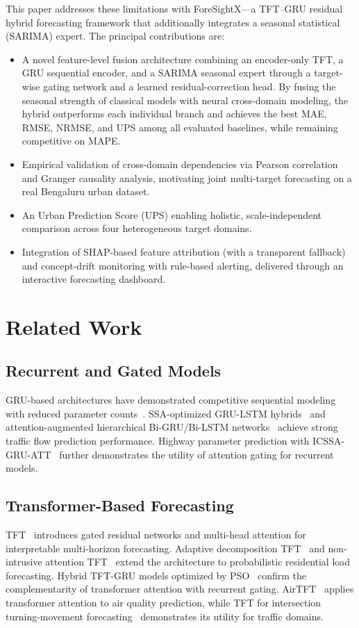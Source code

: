 \documentclass[conference]{IEEEtran}
\begin{document}
This paper addresses these limitations with ForeSightX---a TFT--GRU residual hybrid forecasting framework that additionally integrates a seasonal statistical (SARIMA) expert. The principal contributions are:
\begin{itemize}
\item A novel feature-level fusion architecture combining an encoder-only TFT, a GRU sequential encoder, and a SARIMA seasonal expert through a target-wise gating network and a learned residual-correction head. By fusing the seasonal strength of classical models with neural cross-domain modeling, the hybrid outperforms each individual branch and achieves the best MAE, RMSE, NRMSE, and UPS among all evaluated baselines, while remaining competitive on MAPE.
\item Empirical validation of cross-domain dependencies via Pearson correlation and Granger causality analysis, motivating joint multi-target forecasting on a real Bengaluru urban dataset.
\item An Urban Prediction Score (UPS) enabling holistic, scale-independent comparison across four heterogeneous target domains.
\item Integration of SHAP-based feature attribution (with a transparent fallback) and concept-drift monitoring with rule-based alerting, delivered through an interactive forecasting dashboard.
\end{itemize}

\section{Related Work}
\subsection{Recurrent and Gated Models}
GRU-based architectures have demonstrated competitive sequential modeling with reduced parameter counts~\cite{ref3}. SSA-optimized GRU-LSTM hybrids~\cite{ref12} and attention-augmented hierarchical Bi-GRU/Bi-LSTM networks~\cite{ref13} achieve strong traffic flow prediction performance. Highway parameter prediction with ICSSA-GRU-ATT~\cite{ref14} further demonstrates the utility of attention gating for recurrent models.

\subsection{Transformer-Based Forecasting}
TFT~\cite{ref4} introduces gated residual networks and multi-head attention for interpretable multi-horizon forecasting. Adaptive decomposition TFT~\cite{ref5} and non-intrusive attention TFT~\cite{ref15} extend the architecture to probabilistic residential load forecasting. Hybrid TFT-GRU models optimized by PSO~\cite{ref16} confirm the complementarity of transformer attention with recurrent gating. AirTFT~\cite{ref17} applies transformer attention to air quality prediction, while TFT for intersection turning-movement forecasting~\cite{ref6} demonstrates its utility for traffic domains.
\end{document}
